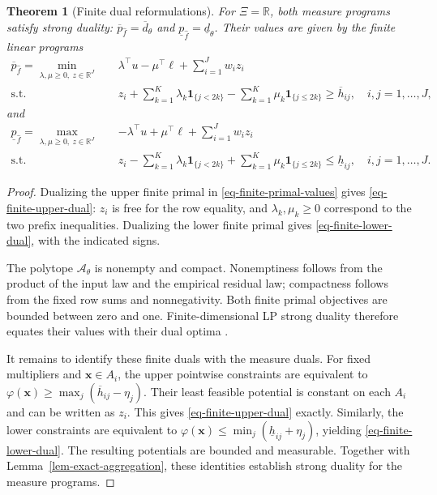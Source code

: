 \documentclass[review,11pt,3p,authoryear,nopreprintline]{elsarticle}
\newtheorem{theorem}{Theorem}
\begin{document}
\begin{theorem}[Finite dual reformulations]
  \label{thm-finite-dual-reformulations}
  For $\Xi=\mathbb R$, both measure programs satisfy strong duality:
  $\overline p_{\hat f}=\overline d_\theta$ and
  $\underline p_{\hat f}=\underline d_\theta$. Their values are given by the finite linear programs
  \begin{equation}
    \begin{aligned}
      \overline p_{\hat f}=\min_{\lambda,\mu\ge0,\ z\in\mathbb R^J}\quad&
      \lambda^\top u-\mu^\top\ell+\sum_{i=1}^Jw_i z_i\\
      \text{s.t.}\quad&
      z_i+\sum_{k=1}^K\lambda_k\mathbf1_{\{j<2k\}}
      -\sum_{k=1}^K\mu_k\mathbf1_{\{j\le2k\}}
      \ge\overline h_{ij},
      \quad i,j=1,\ldots,J,
    \end{aligned}
    \label{eq-finite-upper-dual}
  \end{equation}
  and
  \begin{equation}
    \begin{aligned}
      \underline p_{\hat f}=\max_{\lambda,\mu\ge0,\ z\in\mathbb R^J}\quad&
      -\lambda^\top u+\mu^\top\ell+\sum_{i=1}^Jw_i z_i\\
      \text{s.t.}\quad&
      z_i-\sum_{k=1}^K\lambda_k\mathbf1_{\{j<2k\}}
      +\sum_{k=1}^K\mu_k\mathbf1_{\{j\le2k\}}
      \le\underline h_{ij},
      \quad i,j=1,\ldots,J.
    \end{aligned}
    \label{eq-finite-lower-dual}
  \end{equation}
\end{theorem}
\begin{proof}
  Dualizing the upper finite primal in \eqref{eq-finite-primal-values} gives \eqref{eq-finite-upper-dual}: $z_i$ is free for the row equality, and $\lambda_k,\mu_k\ge0$ correspond to the two prefix inequalities. Dualizing the lower finite primal gives \eqref{eq-finite-lower-dual}, with the indicated signs.

  The polytope $\mathcal A_\theta$ is nonempty and compact. Nonemptiness follows from the product of the input law and the empirical residual law; compactness follows from the fixed row sums and nonnegativity. Both finite primal objectives are bounded between zero and one. Finite-dimensional LP strong duality therefore equates their values with their dual optima \citep{B.V04}.

  It remains to identify these finite duals with the measure duals. For fixed multipliers and $\bm x\in A_i$, the upper pointwise constraints are equivalent to
  $\varphi(\bm x)\ge\max_j(\overline h_{ij}-\eta_j)$.
  Their least feasible potential is constant on each $A_i$ and can be written as $z_i$. This gives \eqref{eq-finite-upper-dual} exactly. Similarly, the lower constraints are equivalent to
  $\varphi(\bm x)\le\min_j(\underline h_{ij}+\eta_j)$,
  yielding \eqref{eq-finite-lower-dual}. The resulting potentials are bounded and measurable. Together with Lemma~\ref{lem-exact-aggregation}, these identities establish strong duality for the measure programs.
\end{proof}
\end{document}

